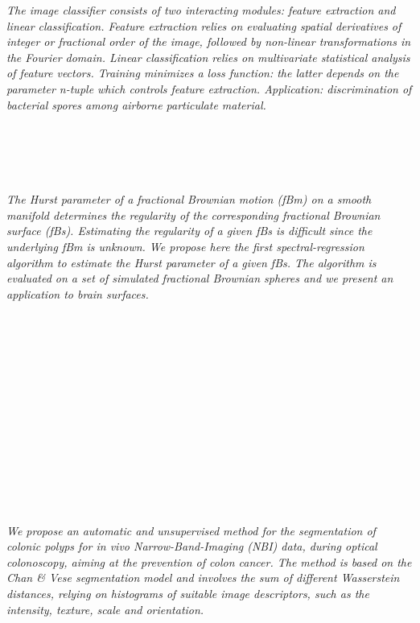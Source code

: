   \begin{multicols}{2}
    \textit{The image classifier consists of two interacting modules: feature extraction and linear classification. Feature extraction relies on evaluating spatial derivatives of integer or fractional order of the image, followed by non-linear transformations in the Fourier domain. Linear classification relies on multivariate statistical analysis of feature vectors. Training minimizes a loss function: the latter depends on the parameter n-tuple which controls feature extraction. Application: discrimination of bacterial spores among airborne particulate material.}\\
\\ 
      \\
      \\\\
\\
    \textit{The Hurst parameter of a fractional Brownian motion (fBm) on a smooth manifold determines the regularity of the corresponding
fractional Brownian surface (fBs). Estimating the regularity of a given fBs is difficult since the underlying fBm is unknown. We propose here the first spectral-regression algorithm to estimate the Hurst parameter of a given fBs. The algorithm is evaluated on a set of simulated fractional Brownian spheres and we present an application to brain surfaces.}\\
\\ 
      \\
      \\\\
      \\
      \\\\
      \\
      \\\\
      \\
      \\\\
\\
    \textit{We propose an automatic and unsupervised method for the segmentation of colonic polyps for   in vivo  Narrow-Band-Imaging (NBI) data, during optical colonoscopy,  aiming at the prevention of colon cancer.
 The method is based on the Chan \& Vese segmentation model and involves the sum of different Wasserstein distances, relying on histograms of suitable image descriptors, such as the intensity, texture, scale and orientation.}\\

\end{multicols}
